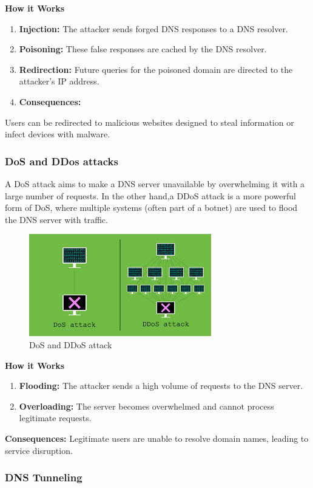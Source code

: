 \textbf{How it Works}
\begin{enumerate}
	\item \textbf{Injection:} The attacker sends forged DNS responses to a DNS resolver.
	\item \textbf{Poisoning:} These false responses are cached by the DNS resolver.
	\item \textbf{Redirection:} Future queries for the poisoned domain are directed to the attacker's IP address.
	\item \textbf{Consequences:}
\end{enumerate}


Users can be redirected to malicious websites designed to steal information or infect devices with malware.

\subsubsection{DoS and DDos attacks}
A DoS attack aims to make a DNS server unavailable by overwhelming it with a large number of requests. In the other hand,a DDoS attack is a more powerful form of DoS, where multiple systems (often part of a botnet) are used to flood the DNS server with traffic.
\begin{figure}[ht!]
	\centering
	\includegraphics[width=0.5\linewidth]{chap1/images/dos.jpg}
	\caption{DoS and DDoS attack \cite{liquidweb2023dns}}
	\label{fig:enter-label}
\end{figure}

\textbf{How it Works}
\begin{enumerate}
	\item \textbf{Flooding:} The attacker sends a high volume of requests to the DNS server.
	\item \textbf{Overloading:} The server becomes overwhelmed and cannot process legitimate requests.
\end{enumerate}

\textbf{Consequences:}
Legitimate users are unable to resolve domain names, leading to service disruption.

\subsubsection{DNS Tunneling}

